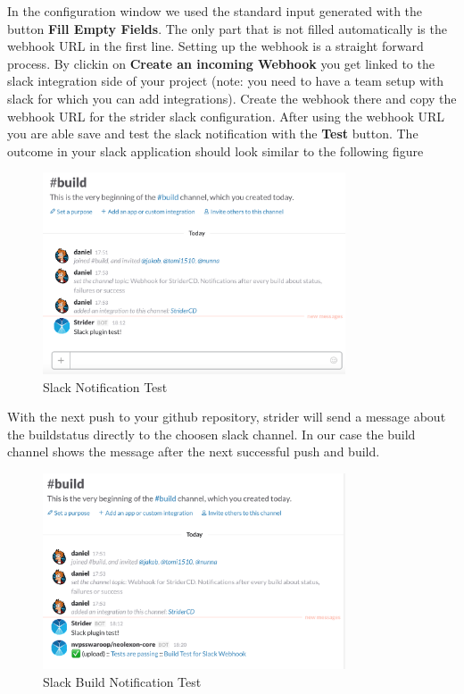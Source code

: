 In the configuration window we used the standard input generated with the button \textbf{Fill Empty Fields}. The only part that is not
filled automatically is the webhook URL in the first line. Setting up the webhook is a straight forward process. By clickin on
\textbf{Create an incoming Webhook} you get linked to the slack integration side of your project (note: you need to have a team setup
with slack for which you can add integrations). Create the webhook there and copy the webhook URL for the strider slack configuration.
After using the webhook URL you are able save and test the slack notification with the \textbf{Test} button. The outcome in your slack
application should look similar to the following figure

\begin{figure}[h!]
  \centering
  \includegraphics[width=0.8\textwidth]{images/slack_test.png}
  \caption{Slack Notification Test}
\end{figure}

With the next push to your github repository, strider will send a message about the buildstatus directly to the choosen slack channel.
In our case the build channel shows the message after the next successful push and build.

\begin{figure}[h!]
  \centering
  \includegraphics[width=0.8\textwidth]{images/slack_buildtest.png}
  \caption{Slack Build Notification Test}
\end{figure}

